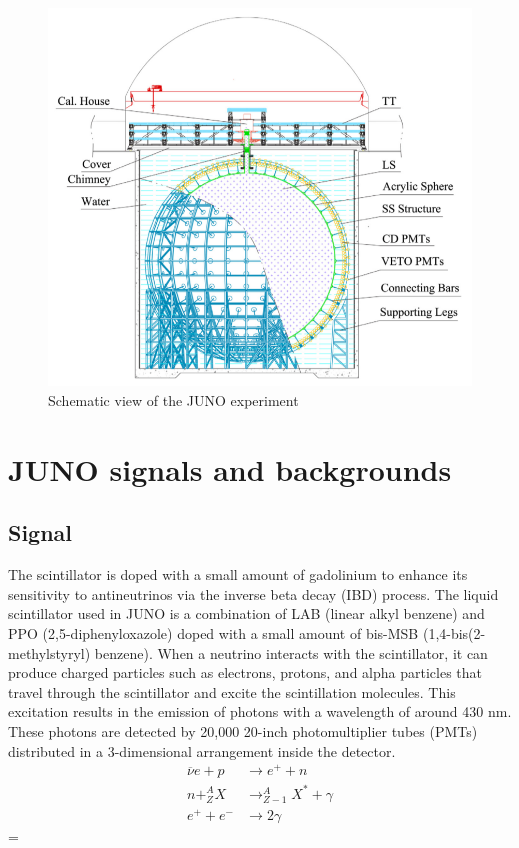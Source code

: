 \begin{figure}[h]
	\centering
	\includegraphics[width=0.7\linewidth]{Images/juno_scheme_experiment}
	\caption[JUNO scheme experiment]{Schematic view of the JUNO experiment}
	\label{fig:junoschemeexperiment}
\end{figure}


\section{JUNO signals and backgrounds}
\subsection{Signal}
The scintillator is doped with a small amount of gadolinium to enhance its sensitivity to antineutrinos via the inverse beta decay (IBD) process. The liquid scintillator used in JUNO is a combination of LAB (linear alkyl benzene) and PPO (2,5-diphenyloxazole) doped with a small amount of bis-MSB (1,4-bis(2-methylstyryl) benzene). When a neutrino interacts with the scintillator, it can produce charged particles such as electrons, protons, and alpha particles that travel through the scintillator and excite the scintillation molecules. This excitation results in the emission of photons with a wavelength of around 430 nm. These photons are detected by 20,000 20-inch photomultiplier tubes (PMTs) distributed in a 3-dimensional arrangement inside the detector.\\




\begin{equation}
	\begin{aligned}
		\overline{\nu}e + p &\rightarrow e^+ + n \\
		n + ^A_ZX &\rightarrow ^{A}_{Z-1}X^* + \gamma \\
		e^+ + e^- &\rightarrow 2\gamma
	\end{aligned}
\end{equation} =

